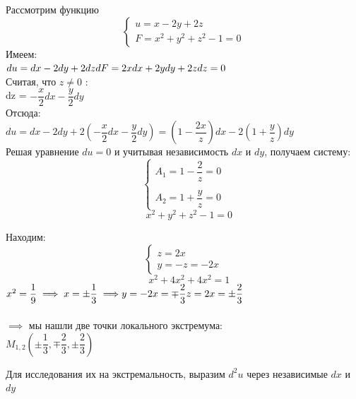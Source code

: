 \documentclass[../../main.tex]{subfiles}
\begin{document}
\begin{example}
	\;
	
	Рассмотрим функцию 
	\[ \begin{cases}
	u = x - 2y + 2z \\
	F = x^2 + y^2 + z^2 -1 = 0
	\end{cases} \]
	Имеем: \\
	$du = dx - 2dy + 2dz \\
	dF = 2xdx + 2ydy + 2zdz = 0$ \\
	Считая, что $z \ne 0$ : \\
	dz = $-\dfrac{x}{2}dx - \dfrac{y}{2}dy $ \\
	Отсюда: \\
	$du = dx - 2dy + 2\left( -\dfrac{x}{2}dx - 
	\dfrac{y}{2} dy \right) = 
	\left( 1 - \dfrac{2x}{z} \right)dx - 
	2\left( 1 + \dfrac{y}{z} \right)dy $ \\
	Решая уравнение $du = 0$ и учитывая независимость $dx$ и $dy$,
	получаем систему:
	\[ \begin{cases}
	A_1 = 1 - \dfrac{2}{z} = 0 \\
	\; \\
	A_2 = 1 + \dfrac{y}{z} = 0
	\end{cases} 
	\]
	\[ \;\;\;\; x^2 + y^2 + z^2 - 1 = 0 \]
	
	Находим:
	\[ \begin{cases}
	z = 2x \\
	y = -z = -2x
	\end{cases} \]
	\[ \;\;\;\; x^2 + 4x^2 + 4x^2 = 1 \]
	$x^2 = \dfrac{1}{9} \implies x = \pm \dfrac{1}{3} \implies \\
	y = -2x = \mp \dfrac{2}{3} \\
	z = 2x = \pm \dfrac{2}{3}$ 
	\\ \; \\
	$\implies$ мы нашли две точки локального экстремума:\\
	$M_{1,2} \left( \pm \dfrac{1}{3}, \mp \dfrac{2}{3}, 
	\pm \dfrac{2}{3} \right)$
	
	Для исследования их на экстремальность, выразим $d^2 u$ через
	независимые $dx$ и $dy$
	 
\end{example}
\end{document}
